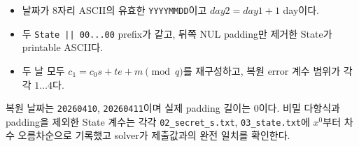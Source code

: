 \documentclass[11pt,a4paper]{article}
\begin{document}
\begin{itemize}
  \item 날짜가 8자리 ASCII의 유효한 \texttt{YYYYMMDD}이고
        $\mathit{day2}=\mathit{day1}+1$ day이다.
  \item 두 \texttt{State || 00...00} prefix가 같고, 뒤쪽 NUL
        padding만 제거한 State가 printable ASCII다.
  \item 두 날 모두 $c_1=c_0s+te+m\pmod q$를 재구성하고,
        복원 error 계수 범위가 각각 $1\ldots4$다.
\end{itemize}

복원 날짜는 \texttt{20260410}, \texttt{20260411}이며 실제 padding
길이는 0이다. 비밀 다항식과 padding을 제외한 State 계수는 각각
\texttt{02\_secret\_s.txt}, \texttt{03\_state.txt}에
$x^0$부터 차수 오름차순으로 기록했고 solver가 제출값과의 완전
일치를 확인한다.

\vspace{2mm}
\begin{center}
\end{center}
\end{document}
